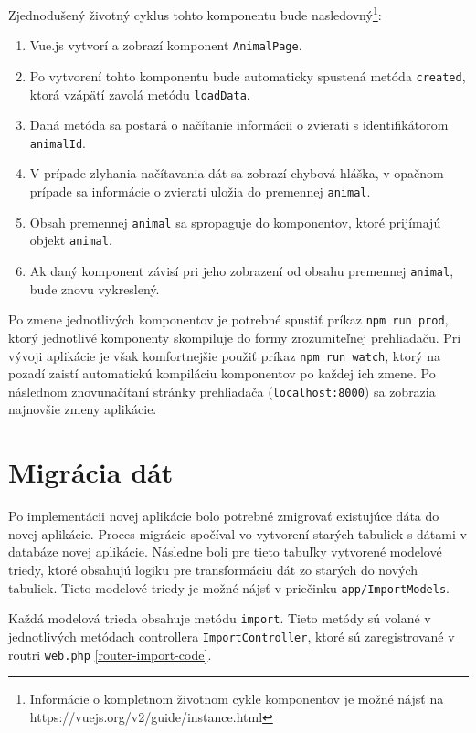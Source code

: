 Zjednodušený životný cyklus tohto komponentu bude nasledovný\footnote{Informácie o kompletnom životnom cykle komponentov je možné nájsť na https://vuejs.org/v2/guide/instance.html}:
\begin{enumerate}
	\item Vue.js vytvorí a zobrazí komponent \texttt{AnimalPage}.
	\item Po vytvorení tohto komponentu bude automaticky spustená metóda \texttt{created}, ktorá vzápätí zavolá metódu \texttt{loadData}.
	\item Daná metóda sa postará o načítanie informácii o zvierati s identifikátorom \texttt{animalId}.
	\item V prípade zlyhania načítavania dát sa zobrazí chybová hláška, v opačnom prípade sa informácie o zvierati uložia do premennej \texttt{animal}.
	\item Obsah premennej \texttt{animal} sa spropaguje do komponentov, ktoré prijímajú objekt \texttt{animal}.
	\item Ak daný komponent závisí pri jeho zobrazení od obsahu premennej \texttt{animal}, bude znovu vykreslený.
\end{enumerate}

Po zmene jednotlivých komponentov je potrebné spustiť príkaz \texttt{npm run prod}, ktorý jednotlivé komponenty skompiluje do formy zrozumiteľnej prehliadaču. Pri vývoji aplikácie je však komfortnejšie použiť príkaz \texttt{npm run watch}, ktorý na pozadí zaistí automatickú kompiláciu komponentov po každej ich zmene. Po následnom znovunačítaní stránky prehliadača (\texttt{localhost:8000}) sa zobrazia najnovšie zmeny aplikácie.

\section{Migrácia dát}
Po implementácii novej aplikácie bolo potrebné zmigrovať existujúce dáta do novej aplikácie. Proces migrácie spočíval vo vytvorení starých tabuliek s dátami v databáze novej aplikácie. Následne boli pre tieto tabuľky vytvorené modelové triedy, ktoré obsahujú logiku pre transformáciu dát zo starých do nových tabuliek. Tieto modelové triedy je možné nájsť v priečinku \texttt{app/ImportModels}.

Každá modelová trieda obsahuje metódu \texttt{import}. Tieto metódy sú volané v jednotlivých metódach controllera \texttt{ImportController}, ktoré sú zaregistrované v routri \texttt{web.php} \ref{router-import-code}.

